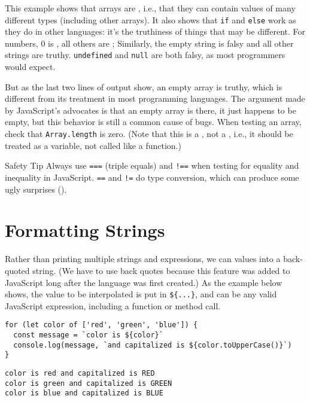 This example shows that arrays are ,
i.e.,
that they can contain values of many different types
(including other arrays).
It also shows that \texttt{if} and \texttt{else} work as they do in other languages:
it's the truthiness of things that may be different.
For numbers,
0 is , all others are ;
Similarly,
the empty string is falsy and all other strings are truthy.
\texttt{undefined} and \texttt{null} are both falsy,
as most programmers would expect.

But as the last two lines of output show,
an empty array is truthy,
which is different from its treatment in most programming languages.
The argument made by JavaScript's advocates is that an empty array is there,
it just happens to be empty,
but this behavior is still a common cause of bugs.
When testing an array,
check that \texttt{Array.length} is zero.
(Note that this is a ,
not a ,
i.e.,
it should be treated as a variable,
not called like a function.)

\begin{aside}{Safety Tip}
  Always use \texttt{===} (triple equals) and \texttt{!==} when testing for equality and inequality in JavaScript.
  \texttt{==} and \texttt{!=} do type conversion,
  which can produce some ugly surprises ().
\end{aside}

\section{Formatting Strings}\label{s:basics-formatting}

Rather than printing multiple strings and expressions,
we can  values into a back-quoted string.
(We have to use back quotes because this feature was added to JavaScript
long after the language was first created.)
As the example below shows,
the value to be interpolated is put in \texttt{\$\{...\}},
and can be any valid JavaScript expression,
including a function or method call.

\begin{verbatim}
for (let color of ['red', 'green', 'blue']) {
  const message = `color is ${color}`
  console.log(message, `and capitalized is ${color.toUpperCase()}`)
}
\end{verbatim}

\begin{verbatim}
color is red and capitalized is RED
color is green and capitalized is GREEN
color is blue and capitalized is BLUE
\end{verbatim}

